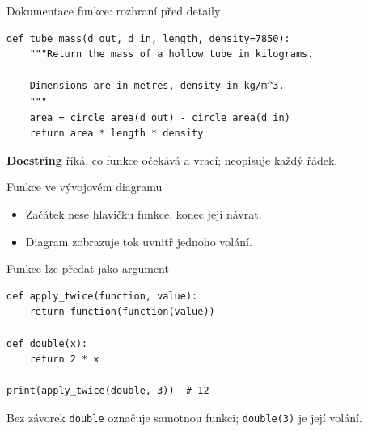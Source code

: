 \documentclass[aspectratio=169]{beamer}
\newcommand{\term}[1]{\textcolor{CodeBlue}{\textbf{#1}}}
\begin{document}
\begin{frame}[fragile]{Dokumentace funkce: rozhraní před detaily}
\begin{lstlisting}[style=python,basicstyle=\ttfamily\normalsize]
def tube_mass(d_out, d_in, length, density=7850):
    """Return the mass of a hollow tube in kilograms.

    Dimensions are in metres, density in kg/m^3.
    """
    area = circle_area(d_out) - circle_area(d_in)
    return area * length * density
\end{lstlisting}
  \term{Docstring} říká, co funkce očekává a vrací; neopisuje každý řádek.
\end{frame}

\begin{frame}{Funkce ve vývojovém diagramu}
  \centering
  \vspace{4mm}

  \begin{itemize}
    \item Začátek nese hlavičku funkce, konec její návrat.
    \item Diagram zobrazuje tok uvnitř jednoho volání.
  \end{itemize}
\end{frame}

\begin{frame}[fragile]{Funkce lze předat jako argument}
\begin{lstlisting}[style=python]
def apply_twice(function, value):
    return function(function(value))

def double(x):
    return 2 * x

print(apply_twice(double, 3))  # 12
\end{lstlisting}
  Bez závorek \texttt{double} označuje samotnou funkci; \texttt{double(3)} je její volání.
\end{frame}
\end{document}
